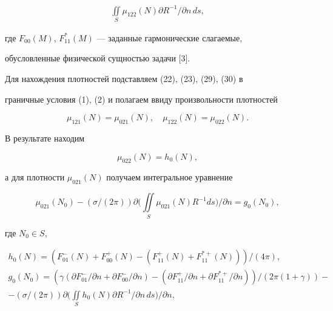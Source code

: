\begin{pf}
\begin{gather}
\iint\limits_S \mu_{122}(N)\partial R^{-1}/ 


\partial n\,d s, 


\end{gather} 


где $F_{00}(M)$, $F^*_{11}(M)$ --- заданные гармонические слагаемые,  


обусловленные физической сущностью задачи [3]. 


 


Для нахождения плотностей подставляем (22), (23), (29), (30) в  


граничные условия (1), (2) и полагаем ввиду произвольности плотностей 


$$ 


\mu_{121}(N)=\mu_{021}(N),\quad 


\mu_{122}(N)=\mu_{022}(N). 


$$ 


В результате находим 


$$ 


\mu_{022}(N)=h_0(N), 


$$ 


а для плотности $\mu_{021}(N)$ получаем интегральное уравнение 


\begin{equation} 


\mu_{021}(N_0)-(\sigma/(2\pi))\partial\bigg(\iint\limits_S 


\mu_{021}(N)R^{-1}d s\bigg)/\partial n=g_0(N_0), 


\end{equation} 


где $N_0\in S$, 


\begin{gather*} 


h_0(N)=(F^-_{01}(N)+F^+_{00}(N)-(F^+_{11}(N)+F^{*+}_{11}(N)))/(4\pi),\\ 


% 


g_0(N_0)=(\gamma(\partial F^-_{01}/\partial n+\partial F^-_{00} 


/\partial n)-(\partial F^+_{11}/\partial n+\partial F^{*+}_{11} 


/\partial n))/(2\pi(1+\gamma))- \\ -(\sigma/(2\pi))\partial\bigg( 


\iint\limits_S h_0(N)\partial R^{-1}/\partial n\,d s 


\bigg)/\partial n,\\ 



\end{gather*}
\end{pf}
